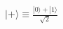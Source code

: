 \documentclass[preview]{standalone}
\begin{document}
\begin{align*}
|+\rangle \equiv \frac{|0\rangle + |1\rangle}{\sqrt{2}}
\end{align*}
\end{document}
